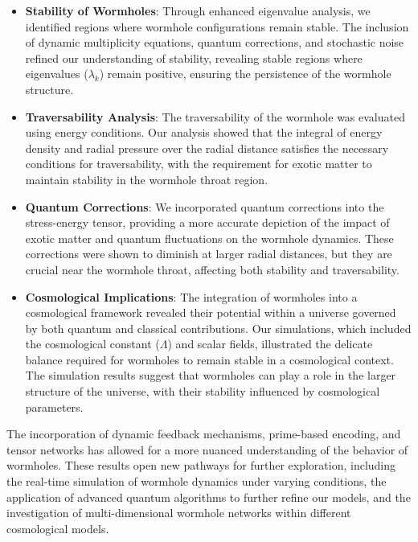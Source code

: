 \documentclass{article}
\theoremstyle{plain}
\begin{document}
\begin{itemize}
\begin{itemize}
\begin{itemize}
    \item \textbf{Stability of Wormholes}: Through enhanced eigenvalue analysis, we identified regions where wormhole configurations remain stable. The inclusion of dynamic multiplicity equations, quantum corrections, and stochastic noise refined our understanding of stability, revealing stable regions where eigenvalues (\(\lambda_k\)) remain positive, ensuring the persistence of the wormhole structure.
    \item \textbf{Traversability Analysis}: The traversability of the wormhole was evaluated using energy conditions. Our analysis showed that the integral of energy density and radial pressure over the radial distance satisfies the necessary conditions for traversability, with the requirement for exotic matter to maintain stability in the wormhole throat region.
    \item \textbf{Quantum Corrections}: We incorporated quantum corrections into the stress-energy tensor, providing a more accurate depiction of the impact of exotic matter and quantum fluctuations on the wormhole dynamics. These corrections were shown to diminish at larger radial distances, but they are crucial near the wormhole throat, affecting both stability and traversability.
    \item \textbf{Cosmological Implications}: The integration of wormholes into a cosmological framework revealed their potential within a universe governed by both quantum and classical contributions. Our simulations, which included the cosmological constant (\(\Lambda\)) and scalar fields, illustrated the delicate balance required for wormholes to remain stable in a cosmological context. The simulation results suggest that wormholes can play a role in the larger structure of the universe, with their stability influenced by cosmological parameters.
\end{itemize}

The incorporation of dynamic feedback mechanisms, prime-based encoding, and tensor networks has allowed for a more nuanced understanding of the behavior of wormholes. These results open new pathways for further exploration, including the real-time simulation of wormhole dynamics under varying conditions, the application of advanced quantum algorithms to further refine our models, and the investigation of multi-dimensional wormhole networks within different cosmological models.


\end{itemize}
\end{itemize}
\end{document}

